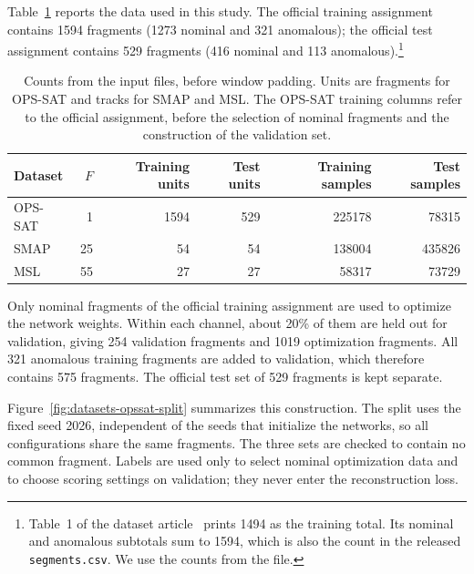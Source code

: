 Table~\ref{tab:datasets-inventory} reports the data used in this study. The
official training assignment contains \num{1594} fragments (\num{1273}
nominal and \num{321} anomalous); the official test assignment contains
\num{529} fragments (\num{416} nominal and \num{113} anomalous).\footnote{Table~1
of the dataset article~\cite{Ruszczak2025OPSSAT} prints \num{1494} as the
training total. Its nominal and anomalous subtotals sum to \num{1594}, which
is also the count in the released \texttt{segments.csv}. We use the counts
from the file.}

\begin{table}[htbp]
  \centering
  \small
  \begin{tabular}{@{}lrrrrr@{}}
    \toprule
    Dataset & \(F\) & Training units & Test units & Training samples & Test samples \\
    \midrule
    \acs{OPS-SAT} & 1 & \num{1594} & \num{529} & \num{225178} & \num{78315} \\
    \acs{SMAP} & 25 & \num{54} & \num{54} & \num{138004} & \num{435826} \\
    \acs{MSL} & 55 & \num{27} & \num{27} & \num{58317} & \num{73729} \\
    \bottomrule
  \end{tabular}
  \caption{Counts from the input files, before window padding. Units are
  fragments for \acs{OPS-SAT} and tracks for \acs{SMAP} and \acs{MSL}. The
  \acs{OPS-SAT} training columns refer to the official assignment, before
  the selection of nominal fragments and the construction of the validation
  set.}
  \label{tab:datasets-inventory}
\end{table}

Only nominal fragments of the official training assignment are used to
optimize the network weights. Within each channel, about \num{20}\% of them
are held out for validation, giving \num{254} validation fragments and
\num{1019} optimization fragments. All \num{321} anomalous training fragments
are added to validation, which therefore contains \num{575} fragments. The
official test set of \num{529} fragments is kept separate.

Figure~\ref{fig:datasets-opssat-split} summarizes this construction. The split
uses the fixed seed \num{2026}, independent of the seeds that initialize the
networks, so all configurations share the same fragments. The three sets
are checked to contain no common fragment. Labels are used only to select
nominal optimization data and to choose scoring settings on validation;
they never enter the reconstruction loss.

